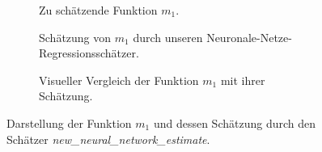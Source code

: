 \begin{figure}
    \begin{subfigure}[b]{0.5\textwidth}
        \centering
        \scalebox{0.9}{
          }
        \caption{Zu schätzende Funktion $m_1$. \\\qquad  }
        \label{fig:subfig8}
    \end{subfigure}
    \begin{subfigure}[b]{0.5\textwidth}
    \centering
    \scalebox{0.9}{
           }
        \caption{Schätzung von $m_1$ durch unseren Neuronale-Netze-Regressionsschätzer.}   
        \label{fig:subfig9}
    \end{subfigure}
       \hspace{0.4cm}
    \begin{subfigure}[b]{1\textwidth}
    \centering
    \scalebox{0.9}{
	}
	 \caption{Visueller Vergleich der Funktion $m_1$ mit ihrer Schätzung.}
        \label{fig:subfig810}
    \end{subfigure}
    \caption{Darstellung der Funktion $m_1$ und dessen Schätzung durch den Schätzer \textit{new\_neural\_network\_estimate}.} 
\label{fig:subfig1.a.4}
\end{figure}


